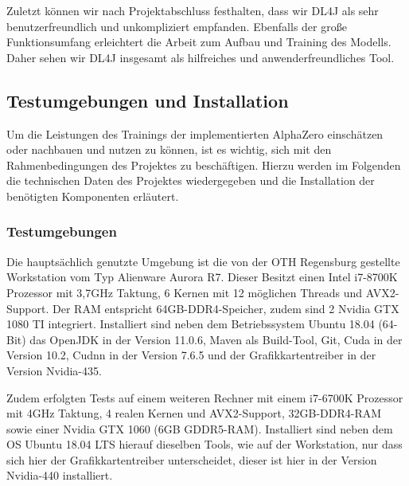 \documentclass[12pt,a4paper]{article}
\begin{document}
Zuletzt können wir nach Projektabschluss festhalten, dass wir DL4J als sehr benutzerfreundlich und unkompliziert empfanden. Ebenfalls der große Funktionsumfang erleichtert die Arbeit zum Aufbau und Training des Modells. Daher sehen wir DL4J insgesamt als hilfreiches und anwenderfreundliches Tool.


\subsection{Testumgebungen und Installation}
Um die Leistungen des Trainings der implementierten AlphaZero einschätzen oder nachbauen und nutzen zu können, ist es wichtig, sich mit den Rahmenbedingungen des Projektes zu beschäftigen. Hierzu werden im Folgenden die technischen Daten des Projektes wiedergegeben und die Installation der benötigten Komponenten erläutert.

\subsubsection{Testumgebungen}
Die hauptsächlich genutzte Umgebung ist die von der OTH Regensburg gestellte Workstation vom Typ Alienware Aurora R7. Dieser Besitzt einen Intel i7-8700K Prozessor mit 3,7GHz Taktung, 6 Kernen mit 12 möglichen Threads und AVX2-Support. Der RAM entspricht 64GB-DDR4-Speicher, zudem sind 2 Nvidia GTX 1080 TI integriert. Installiert sind neben dem Betriebssystem Ubuntu 18.04 (64-Bit) das OpenJDK in der Version 11.0.6, Maven als Build-Tool, Git, Cuda in der Version 10.2, Cudnn in der Version 7.6.5 und der Grafikkartentreiber in der Version Nvidia-435.

Zudem erfolgten Tests auf einem weiteren Rechner mit einem i7-6700K Prozessor mit 4GHz Taktung, 4 realen Kernen und AVX2-Support, 32GB-DDR4-RAM sowie einer Nvidia GTX 1060 (6GB GDDR5-RAM). Installiert sind neben dem OS Ubuntu 18.04 LTS hierauf dieselben Tools, wie auf der Workstation, nur dass sich hier der Grafikkartentreiber unterscheidet, dieser ist hier in der Version Nvidia-440 installiert. 

\end{document}
